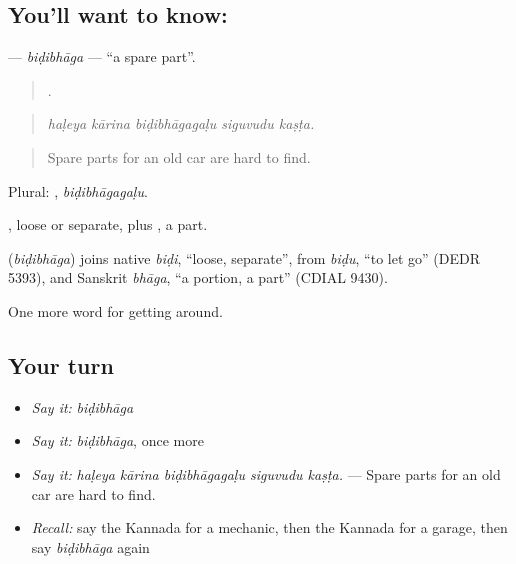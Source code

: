 \subsection*{You'll want to know: }
\textbf{} — \emph{biḍibhāga} — \textquotedblleft{}a spare part\textquotedblright{}.

\begin{quote}
    .
\end{quote}

\begin{quote}
\emph{haḷeya kārina biḍibhāgagaḷu siguvudu kaṣṭa.}
\end{quote}

\begin{quote}
Spare parts for an old car are hard to find.
\end{quote}

Plural: , \emph{biḍibhāgagaḷu}.

, loose or separate, plus , a part.

\begin{cousinweb}
\textbf{} (\emph{biḍibhāga}) joins native \emph{biḍi}, \textquotedblleft{}loose, separate\textquotedblright{}, from \emph{biḍu}, \textquotedblleft{}to let go\textquotedblright{} (DEDR 5393), and Sanskrit \emph{bhāga}, \textquotedblleft{}a portion, a part\textquotedblright{} (CDIAL 9430).
\end{cousinweb}

\begin{grammarlens}[title={What you've built}]
One more word for getting around.
\end{grammarlens}

\subsection*{Your turn}
\begin{itemize}
\raggedright
  \item \emph{Say it:} \emph{biḍibhāga}
  \item \emph{Say it:} \emph{biḍibhāga}, once more
  \item \emph{Say it:} \emph{haḷeya kārina biḍibhāgagaḷu siguvudu kaṣṭa.} — Spare parts for an old car are hard to find.
  \item \emph{Recall:} say the Kannada for a mechanic, then the Kannada for a garage, then say \emph{biḍibhāga} again
\end{itemize}

